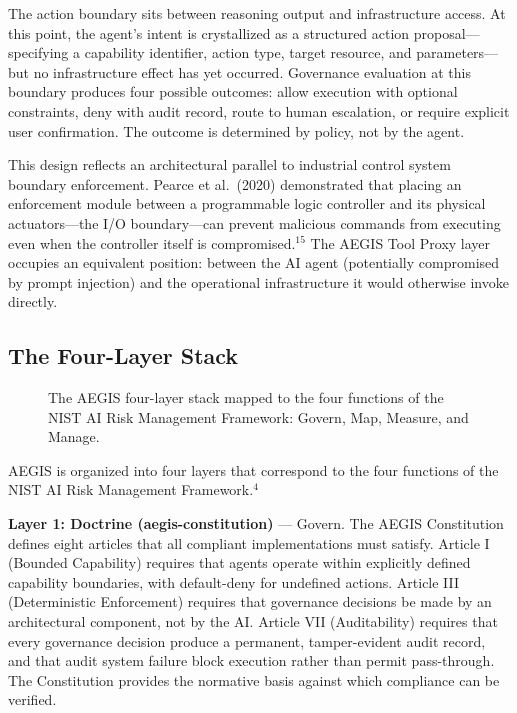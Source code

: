 \documentclass{IEEEcsmag}
\begin{document}
The action boundary sits between reasoning output and infrastructure access. At this point, the agent's intent is crystallized as a structured action proposal---specifying a capability identifier, action type, target resource, and parameters---but no infrastructure effect has yet occurred. Governance evaluation at this boundary produces four possible outcomes: allow execution with optional constraints, deny with audit record, route to human escalation, or require explicit user confirmation. The outcome is determined by policy, not by the agent.

This design reflects an architectural parallel to industrial control system boundary enforcement. Pearce et al.\ (2020) demonstrated that placing an enforcement module between a programmable logic controller and its physical actuators---the I/O boundary---can prevent malicious commands from executing even when the controller itself is compromised.$^{15}$ The AEGIS Tool Proxy layer occupies an equivalent position: between the AI agent (potentially compromised by prompt injection) and the operational infrastructure it would otherwise invoke directly.

\subsection{The Four-Layer Stack}

\begin{figure}[!t]
\centering
\caption{The AEGIS four-layer stack mapped to the four functions of the NIST AI Risk Management Framework: Govern, Map, Measure, and Manage.}
\label{fig:fourlayer}
\end{figure}

AEGIS is organized into four layers that correspond to the four functions of the NIST AI Risk Management Framework.$^{4}$

{\bf Layer 1: Doctrine (aegis-constitution)} --- Govern. The AEGIS Constitution defines eight articles that all compliant implementations must satisfy. Article I (Bounded Capability) requires that agents operate within explicitly defined capability boundaries, with default-deny for undefined actions. Article III (Deterministic Enforcement) requires that governance decisions be made by an architectural component, not by the AI. Article VII (Auditability) requires that every governance decision produce a permanent, tamper-evident audit record, and that audit system failure block execution rather than permit pass-through. The Constitution provides the normative basis against which compliance can be verified.
\end{document}
